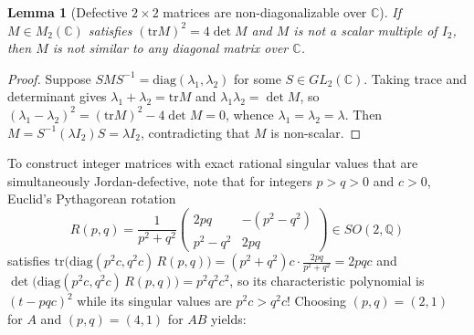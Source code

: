 \documentclass[11pt,a4paper]{article}
\newtheorem{lemma}[theorem]{Lemma}
\theoremstyle{definition}
\newcommand{\C}{\mathbb{C}}
\newcommand{\Q}{\mathbb{Q}}
\newcommand{\diag}{\mathrm{diag}}
\newcommand{\tr}{\mathrm{tr}}
\begin{document}
\begin{lemma}[Defective $2\times 2$ matrices are non-diagonalizable over $\C$]\label{lem:defective}
If $M \in M_2(\C)$ satisfies $(\tr M)^2 = 4\det M$ and $M$ is not a scalar multiple of $I_2$, then $M$ is not similar to any diagonal matrix over $\C$.
\end{lemma}

\begin{proof}
Suppose $S M S^{-1} = \diag(\lambda_1, \lambda_2)$ for some $S \in GL_2(\C)$. Taking trace and determinant gives $\lambda_1 + \lambda_2 = \tr M$ and $\lambda_1 \lambda_2 = \det M$, so $(\lambda_1 - \lambda_2)^2 = (\tr M)^2 - 4\det M = 0$, whence $\lambda_1 = \lambda_2 = \lambda$. Then $M = S^{-1}(\lambda I_2)S = \lambda I_2$, contradicting that $M$ is non-scalar.
\end{proof}

To construct integer matrices with exact rational singular values that are simultaneously Jordan-defective, note that for integers $p > q > 0$ and $c > 0$, Euclid's Pythagorean rotation
\[
  R(p, q) = \frac{1}{p^2 + q^2}\begin{pmatrix} 2pq & -(p^2 - q^2) \\ p^2 - q^2 & 2pq \end{pmatrix} \in SO(2, \Q)
\]
satisfies $\tr\bigl(\diag(p^2 c, q^2 c)\,R(p, q)\bigr) = (p^2 + q^2)c \cdot \frac{2pq}{p^2 + q^2} = 2pqc$ and $\det\bigl(\diag(p^2 c, q^2 c)\,R(p, q)\bigr) = p^2 q^2 c^2$, so its characteristic polynomial is $(t - pqc)^2$ while its singular values are $p^2 c > q^2 c$! Choosing $(p, q) = (2, 1)$ for $A$ and $(p, q) = (4, 1)$ for $AB$ yields:
\end{document}
